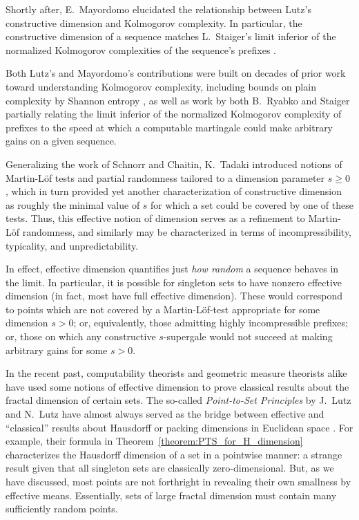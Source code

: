 Shortly after, E.~Mayordomo elucidated the relationship between Lutz's constructive dimension and Kolmogorov complexity. In particular, the constructive dimension of a sequence matches L.~Staiger's limit inferior of the normalized Kolmogorov complexities of the sequence's prefixes \cite{May02, Sta89}. 

Both Lutz's and Mayordomo's contributions were built on decades of prior work toward understanding Kolmogorov complexity, including bounds on plain complexity by Shannon entropy \cite{Sta81}, as well as work by both B.~Ryabko \cite{Rya93, Rya94} and Staiger \cite{Sta98} partially relating the limit inferior of the normalized Kolmogorov complexity of prefixes to the speed at which a computable martingale could make arbitrary gains on a given sequence. 

Generalizing the work of Schnorr and Chaitin, K.~Tadaki introduced notions of Martin-L{\"o}f tests and partial randomness tailored to a dimension parameter $s \geq 0$ \cite{Tad02}, which in turn provided yet another characterization of constructive dimension as roughly the minimal value of $s$ for which a set could be covered by one of these tests. Thus, this effective notion of dimension serves as a refinement to Martin-L{\"o}f randomness, and similarly may be characterized in terms of incompressibility, typicality, and unpredictability. 

In effect, effective dimension quantifies just \textit{how random} a sequence behaves in the limit. In particular, it is possible for singleton sets to have nonzero effective dimension (in fact, most have full effective dimension). These would correspond to points which are not covered by a Martin-L{\"o}f-test appropriate for some dimension $s > 0$; or, equivalently, those admitting highly incompressible prefixes; or, those on which any constructive $s$-supergale would not succeed at making arbitrary gains for some $s > 0$.

In the recent past, computability theorists and geometric measure theorists alike have used some notions of effective dimension to prove classical results about the fractal dimension of certain sets. The so-called \textit{Point-to-Set Principles} by J.~Lutz and N.~Lutz have almost always served as the bridge between effective and ``classical'' results about Hausdorff or packing dimensions in Euclidean space \cite{LL18}. For example, their formula in Theorem~\ref{theorem:PTS_for_H_dimension} characterizes the Hausdorff dimension of a set in a pointwise manner: a strange result given that all singleton sets are classically zero-dimensional. But, as we have discussed, most points are not forthright in revealing their own smallness by effective means. Essentially, sets of large fractal dimension must contain many sufficiently random points.

